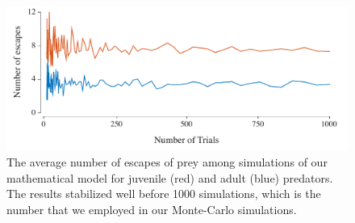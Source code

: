 \documentclass[11pt]{article}
\begin{document}
\pagebreak

\begin{figure}[!h]
\centering
	\includegraphics[width=5.5in]{supp_num_trials}
\caption{The average number of escapes of prey among simulations of our mathematical model for juvenile (red) and adult (blue) predators.
The results stabilized well before 1000 simulations, which is the number that we employed in our Monte-Carlo simulations.
}
\label{fig_sense}
\end{figure}
\end{document}
